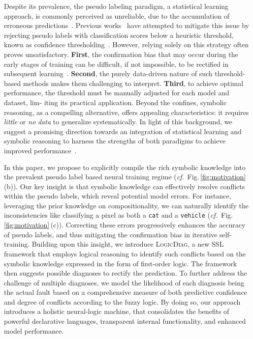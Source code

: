 \documentclass[10pt,twocolumn,letterpaper]{article}
\def\Ours{{\textsc{LogicDiag}}}
\begin{document}
Despite its prevalence, the pseudo labeling paradigm, a statistical learning approach, is commonly perceived as unreliable, {due to} the accumulation of erroneous predictions~\cite{arazo2020pseudo}. Previous works~\cite{sohn2020fixmatch,berthelot2019mixmatch,zhang2021flexmatch} have attempted to mitigate this issue by rejecting pseudo labels with classification scores below a heuristic threshold, known as confidence thresholding~\cite{sohn2020fixmatch}.
However, relying solely on this strategy often proves unsatisfactory.
\textbf{First}, the confirmation bias that may occur during the early stages of training can be difficult, if not impossible, to be rectified in subsequent learning~\cite{chen2022debiased}.
\textbf{Second}, the purely data-driven nature of such threshold-based methods makes them challenging to interpret.
\textbf{Third}, to achieve optimal performance, the threshold must be manually adjusted for each model and dataset, lim- 
\newpage
\noindent iting its practical application.
Beyond the confines, symbolic reasoning, as a compelling alternative, offers appealing characteristics: it requires \textit{little} or \textit{no data} to generalize systematically.
In light of this background, we suggest a promising direction towards an integration of statistical learning and symbolic reasoning to harness the strengths of both paradigms to achieve improved  performance~\cite{fang2018learning,wang2018attentive}.

In this paper, we propose to explicitly compile the rich symbolic knowledge into the prevalent 
pseudo label based neural training regime (\textit{cf.\!}~Fig.\,\ref{fig:motivation}\,(b)).
Our key insight is that symbolic knowledge can effectively resolve conflicts within the pseudo labels, which reveal potential model errors.
For instance, leveraging the prior knowledge on compositionality, we can naturally identify the inconsistencies like classifying a pixel as both a \texttt{cat} and a \texttt{vehicle} (\textit{cf.\!}~Fig.\,\ref{fig:motivation}\,(c)).
Correcting these errors progressively enhances the accuracy of pseudo labels, and thus mitigating the confirmation bias in iterative self-training.
Building upon this insight, we introduce {\Ours}, a new SSL framework that employs logical reasoning to identify such conflicts based on the symbolic knowledge expressed in the form of first-order logic. The framework then suggests possible diagnoses to rectify the prediction. 
To further address the challenge of multiple diagnoses, we model the likelihood of each diagnosis being the actual fault based on a comprehensive measure of both predictive confidence and degree of conflicts according to the fuzzy logic.
By doing so, our approach introduces a holistic neural-logic machine, that consolidates the benefits of powerful declarative languages, transparent internal functionality, and enhanced model performance.
\end{document}
